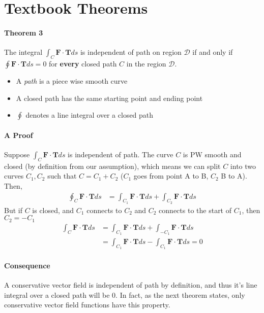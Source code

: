 \documentclass{article}
\begin{document}
\section*{Textbook Theorems}
\paragraph{Theorem 3} The integral $\int_C \mathbf{F}\cdot \mathbf{T} ds$ is independent of path on region $\mathcal{D}$ if and only if $\oint \mathbf{F \cdot T}ds = 0$ for \textbf{every} closed path $C$ in the region $\mathcal{D}$. 
\begin{itemize}
    \item A \textit{path} is a piece wise smooth curve
    \item A closed path has the same starting point and ending point
    \item $\oint$ denotes a line integral over a closed path
\end{itemize}

\paragraph{A Proof} Suppose $\int_C \mathbf{F \cdot T}ds$ is independent of path. The curve $C$ is PW smooth and closed (by definition from our assumption), which means we can split $C$ into two curves $C_1, C_2$ such that $C=C_1 + C_2$ ($C_1$ goes from point A to B, $C_2$ B to A). Then,
\begin{align*}
    \oint_C \mathbf{F \cdot T}ds &= \int_{C_1} \mathbf{F \cdot T}ds + \int_{C_2} \mathbf{F \cdot T}ds
\end{align*}
But if $C$ is closed, and $C_1$ connects to $C_2$ and $C_2$ connects to the start of $C_1$, then $C_2 = - C_1$
\begin{align*}
    \int_C \mathbf{F \cdot T}ds &= \int_{C_1} \mathbf{F \cdot T}ds + \int_{-C_1} \mathbf{F \cdot T}ds \\
    &= \int_{C_1} \mathbf{F \cdot T}ds - \int_{C_1} \mathbf{F \cdot T}ds = 0
\end{align*}

\paragraph{Consequence} A conservative vector field is independent of path by definition, and thus it's line integral over a closed path will be 0. In fact, as the next theorem states, only conservative vector field functions have this property.
\end{document}

